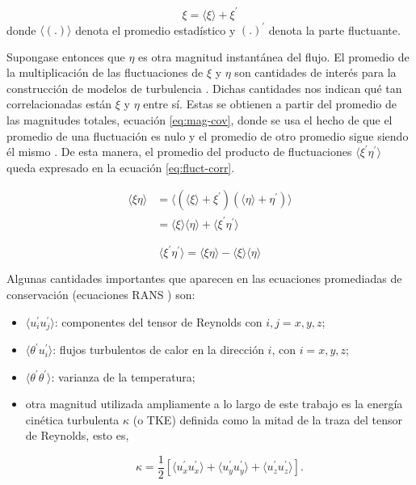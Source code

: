 $$\xi = \langle \xi \rangle + \xi^{\prime}$$
donde $\langle (\text{.}) \rangle$ denota el promedio estadístico y $(\text{.})^{\prime}$ denota la parte fluctuante. 

Supongase entonces que $\eta$ es otra magnitud instantánea del flujo. El promedio de la multiplicación  de las fluctuaciones de $\xi$ y $\eta$ son cantidades de interés para la construcción de modelos de turbulencia \cite{pope2001turbulent}. Dichas cantidades nos indican qué tan correlacionadas están $\xi$ y $\eta$ entre sí. Estas se obtienen a partir del promedio de las magnitudes totales, ecuación \ref{eq:mag-cov}, donde se usa el hecho de que el promedio de una fluctuación es nulo y el promedio de otro promedio sigue siendo él mismo \cite{pope2001turbulent}. De esta manera, el promedio del producto de fluctuaciones $\langle \xi^{\prime} \eta^{\prime} \rangle$ queda expresado en la ecuación \ref{eq:fluct-corr}.

\begin{equation}
\begin{aligned}
\langle \xi \eta \rangle &= \langle (\langle \xi \rangle + \xi^{\prime}) (\langle \eta \rangle + \eta^{\prime}) \rangle \\
                         &= \langle \xi \rangle \langle \eta \rangle + \langle \xi^{\prime} \eta^{\prime} \rangle
\end{aligned}
\label{eq:mag-cov}
\end{equation}

\begin{equation}
\langle \xi^{\prime} \eta^{\prime} \rangle = \langle \xi \eta \rangle - \langle \xi \rangle \langle \eta \rangle
\label{eq:fluct-corr}
\end{equation}

Algunas cantidades importantes que aparecen en las ecuaciones promediadas de conservación (ecuaciones RANS \cite{kundu}) son:

\begin{itemize}
	\item $\langle u^{\prime}_i u^{\prime}_j \rangle$: componentes del tensor de Reynolds con $i,j=x,y,z$;
	\item $\langle \theta^{\prime} u^{\prime}_i \rangle$: flujos turbulentos de calor en la dirección $i$, con $i=x,y,z$;
	\item $\langle \theta^{\prime} \theta^{\prime} \rangle$: varianza de la temperatura;

	\item otra magnitud utilizada ampliamente a lo largo de este trabajo es la energía cinética turbulenta $\kappa$ (o TKE) definida como la mitad de la traza del tensor de Reynolds, esto es, 

\begin{equation}
\kappa = \frac{1}{2} \left[ \langle u^{\prime}_x u^{\prime}_x \rangle + \langle u^{\prime}_y u^{\prime}_y \rangle + \langle u^{\prime}_z u^{\prime}_z \rangle \right] \text{.}
\label{eq:tke}
\end{equation}

\end{itemize}

